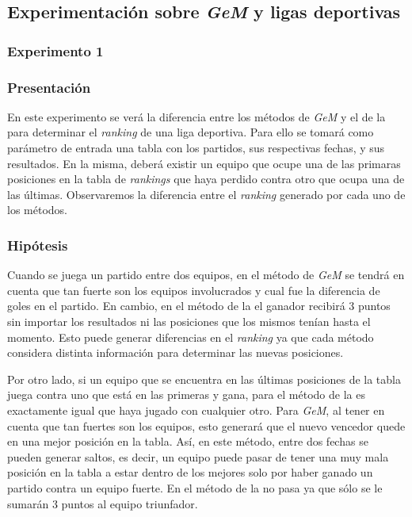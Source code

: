     \subsection{Experimentación sobre \emph{GeM} y ligas deportivas}

        \subsubsection{Experimento 1}
        \subsubsection*{Presentación}
        En este experimento se verá la diferencia entre los métodos de \emph{GeM} y el de la  para determinar el \emph{ranking} de una liga deportiva. Para ello se tomará como parámetro de entrada una tabla con los partidos, sus respectivas fechas, y sus resultados. En la misma, deberá existir un equipo que ocupe una de las primaras posiciones en la tabla de \emph{rankings} que haya perdido contra otro que ocupa una de las últimas. Observaremos la diferencia entre el \emph{ranking} generado por cada uno de los métodos.

            \subsubsection*{Hipótesis}
            Cuando se juega un partido entre dos equipos, en el método de \emph{GeM} se tendrá en cuenta que tan fuerte son los equipos involucrados y cual fue la diferencia de goles en el partido. En cambio, en el método de la  el ganador recibirá 3 puntos sin importar los resultados ni las posiciones que los mismos tenían hasta el momento. Esto puede generar diferencias en el \emph{ranking} ya que cada método considera distinta información para determinar las nuevas posiciones.

            Por otro lado, si un equipo que se encuentra en las últimas posiciones de la tabla juega contra uno que está en las primeras y gana, para el método de la  es exactamente igual que haya jugado con cualquier otro. Para \emph{GeM}, al tener en cuenta que tan fuertes son los equipos, esto generará que el nuevo vencedor quede en una mejor posición en la tabla. Así, en este método, entre dos fechas se pueden generar saltos, es decir, un equipo puede pasar de tener una muy mala posición en la tabla a estar dentro de los mejores solo por haber ganado un partido contra un equipo fuerte. En el método de la  no pasa ya que sólo se le sumarán 3 puntos al equipo triunfador.

